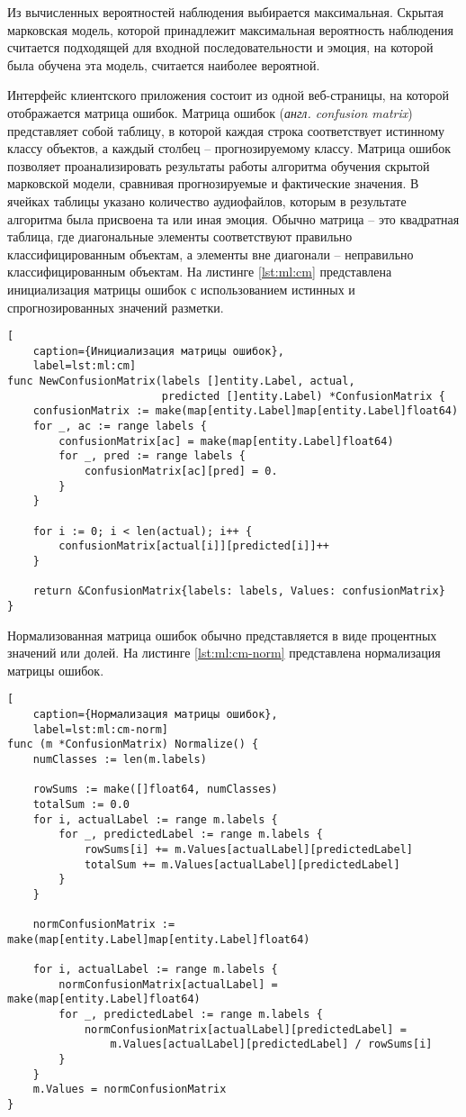 Из вычисленных вероятностей наблюдения выбирается максимальная. Скрытая марковская модель, которой принадлежит максимальная вероятность наблюдения считается подходящей для входной последовательности и эмоция, на которой была обучена эта модель, считается наиболее вероятной.

Интерфейс клиентского приложения состоит из одной веб-страницы, на которой отображается матрица ошибок. Матрица ошибок (\textit{англ. confusion matrix}) представляет собой таблицу, в которой каждая строка соответствует истинному классу объектов, а каждый столбец -- прогнозируемому классу. Матрица ошибок позволяет проанализировать результаты работы алгоритма обучения скрытой марковской модели, сравнивая прогнозируемые и фактические значения. В ячейках таблицы указано количество аудиофайлов, которым в результате алгоритма была присвоена та или иная эмоция. Обычно матрица -- это квадратная таблица, где диагональные элементы соответствуют правильно классифицированным объектам, а элементы вне диагонали -- неправильно классифицированным объектам. На листинге \ref{lst:ml:cm} представлена инициализация матрицы ошибок с использованием истинных и спрогнозированных значений разметки.
\begin{lstlisting}[
	caption={Инициализация матрицы ошибок},
	label=lst:ml:cm]
func NewConfusionMatrix(labels []entity.Label, actual,
						predicted []entity.Label) *ConfusionMatrix {
	confusionMatrix := make(map[entity.Label]map[entity.Label]float64)
	for _, ac := range labels {
		confusionMatrix[ac] = make(map[entity.Label]float64)
		for _, pred := range labels {
			confusionMatrix[ac][pred] = 0.
		}
	}

	for i := 0; i < len(actual); i++ {
		confusionMatrix[actual[i]][predicted[i]]++
	}
	
	return &ConfusionMatrix{labels: labels, Values: confusionMatrix}
}
\end{lstlisting}

Нормализованная матрица ошибок обычно представляется в виде процентных значений или долей. На листинге \ref{lst:ml:cm-norm} представлена нормализация матрицы ошибок.
\begin{lstlisting}[
	caption={Нормализация матрицы ошибок},
	label=lst:ml:cm-norm]
func (m *ConfusionMatrix) Normalize() {
	numClasses := len(m.labels)
	
	rowSums := make([]float64, numClasses)
	totalSum := 0.0
	for i, actualLabel := range m.labels {
		for _, predictedLabel := range m.labels {
			rowSums[i] += m.Values[actualLabel][predictedLabel]
			totalSum += m.Values[actualLabel][predictedLabel]
		}
	}

	normConfusionMatrix := make(map[entity.Label]map[entity.Label]float64)
	
	for i, actualLabel := range m.labels {
		normConfusionMatrix[actualLabel] = make(map[entity.Label]float64)
		for _, predictedLabel := range m.labels {
			normConfusionMatrix[actualLabel][predictedLabel] = 
				m.Values[actualLabel][predictedLabel] / rowSums[i]
		}
	}
	m.Values = normConfusionMatrix
}
\end{lstlisting}

